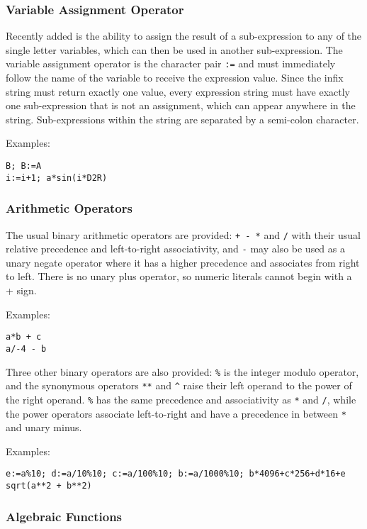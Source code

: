 \subsubsection{Variable Assignment Operator}

Recently added is the ability to assign the result of a sub-expression to any of the single letter variables, which can then be 
used in another sub-expression. The variable assignment operator is the character pair \verb|:=| and must immediately follow 
the name of the variable to receive the expression value. Since the infix string must return exactly one value, every 
expression string must have exactly one sub-expression that is not an assignment, which can appear anywhere in the 
string. Sub-expressions within the string are separated by a semi-colon character.

Examples:

\begin{verbatim}B; B:=A
i:=i+1; a*sin(i*D2R)
\end{verbatim}\subsubsection{Arithmetic Operators}

The usual binary arithmetic operators are provided: \verb|+ - *| and \verb|/| with their usual relative precedence and left-to-right 
associativity, and \verb|-| may also be used as a unary negate operator where it has a higher precedence and associates from 
right to left. There is no unary plus operator, so numeric literals cannot begin with a + sign.

Examples:

\begin{verbatim}a*b + c
a/-4 - b
\end{verbatim}Three other binary operators are also provided: \verb|%| is the integer modulo operator, and the synonymous operators \verb|**| and \verb|^| 
raise their left operand to the power of the right operand. \verb|%| has the same precedence and associativity as \verb|*| and \verb|/|, while 
the power operators associate left-to-right and have a precedence in between \verb|*| and unary minus.

Examples:

\begin{verbatim}e:=a%10; d:=a/10%10; c:=a/100%10; b:=a/1000%10; b*4096+c*256+d*16+e
sqrt(a**2 + b**2)
\end{verbatim}\subsubsection{Algebraic Functions}

